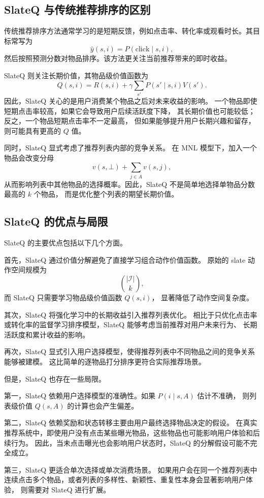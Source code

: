 \documentclass[11pt]{ctexart}
\begin{document}
\subsection{SlateQ 与传统推荐排序的区别}

传统推荐排序方法通常学习的是短期反馈，例如点击率、转化率或观看时长。其目标常写为
\[
\hat{y}(s,i)=P(\text{click}\mid s,i),
\]
然后按照预测分数对物品排序。该方法更关注当前推荐带来的即时收益。

SlateQ 则关注长期价值，其物品级价值函数为
\[
Q(s,i)
=
R(s,i)
+
\gamma
\sum_{s'}P(s'\mid s,i)V(s').
\]
因此，SlateQ 关心的是用户消费某个物品之后对未来收益的影响。
一个物品即使短期点击率较高，如果它会导致用户后续活跃度下降，
其长期价值也可能较低；反之，一个物品短期点击率不一定最高，
但如果能够提升用户长期兴趣和留存，则可能具有更高的 $Q$ 值。

同时，SlateQ 显式考虑了推荐列表内部的竞争关系。
在 MNL 模型下，加入一个物品会改变分母
\[
v(s,\bot)+\sum_{j\in A}v(s,j),
\]
从而影响列表中其他物品的选择概率。因此，SlateQ 不是简单地选择单物品分数最高的 $k$ 个物品，
而是优化整个列表的期望长期价值。

\subsection{SlateQ 的优点与局限}

SlateQ 的主要优点包括以下几个方面。

首先，SlateQ 通过价值分解避免了直接学习组合动作价值函数。
原始的 slate 动作空间规模为
\[
\binom{|\mathcal{I}|}{k},
\]
而 SlateQ 只需要学习物品级价值函数 $Q(s,i)$，
显著降低了动作空间复杂度。

其次，SlateQ 将强化学习中的长期收益引入推荐列表优化。
相比于只优化点击率或转化率的监督学习排序模型，SlateQ 能够考虑当前推荐对用户未来行为、
长期活跃度和累计收益的影响。

再次，SlateQ 显式引入用户选择模型，使得推荐列表中不同物品之间的竞争关系能够被建模。
这比简单的逐物品打分排序更符合实际推荐场景。

但是，SlateQ 也存在一些局限。

第一，SlateQ 依赖用户选择模型的准确性。如果 $P(i\mid s,A)$ 估计不准确，
则列表级价值 $Q(s,A)$ 的计算也会产生偏差。

第二，SlateQ 依赖奖励和状态转移主要由用户最终选择物品决定的假设。
在真实推荐系统中，即使用户没有点击某些曝光物品，这些物品也可能影响用户体验和后续行为。
因此，当未点击曝光也会影响用户状态时，SlateQ 的分解假设可能不完全成立。

第三，SlateQ 更适合单次选择或单次消费场景。
如果用户会在同一个推荐列表中连续点击多个物品，或者列表的多样性、新颖性、重复性本身会显著影响用户体验，
则需要对 SlateQ 进行扩展。
\end{document}
